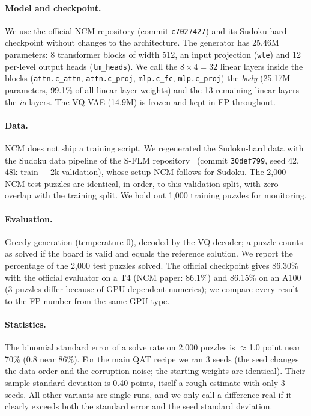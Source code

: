 \documentclass[11pt]{article}
\begin{document}
\paragraph{Model and checkpoint.}
We use the official NCM repository (commit \texttt{c7027427}) and its Sudoku-hard checkpoint without changes to
the architecture. The generator has 25.46M parameters: 8 transformer blocks of width 512, an input projection
(\texttt{wte}) and 12 per-level output heads (\texttt{lm\_heads}). We call the $8\times4=32$ linear layers inside
the blocks (\texttt{attn.c\_attn}, \texttt{attn.c\_proj}, \texttt{mlp.c\_fc}, \texttt{mlp.c\_proj}) the
\emph{body} (25.17M parameters, 99.1\% of all linear-layer weights) and the 13 remaining linear layers the
\emph{io} layers. The VQ-VAE (14.9M) is frozen and kept in FP throughout.

\paragraph{Data.}
NCM does not ship a training script. We regenerated the Sudoku-hard data with the Sudoku data pipeline of the
S-FLM repository~\citep{deschenaux2026sflm} (commit \texttt{30def799}, seed 42, 48k train + 2k validation), whose
setup NCM follows for Sudoku. The 2,000 NCM test puzzles are identical, in order, to this validation split, with
zero overlap with the training split. We hold out 1,000 training puzzles for monitoring.

\paragraph{Evaluation.}
Greedy generation (temperature 0), decoded by the VQ decoder; a puzzle counts as solved if the board is valid and
equals the reference solution. We report the percentage of the 2,000 test puzzles solved. The official checkpoint
gives 86.30\% with the official evaluator on a T4 (NCM paper: 86.1\%) and 86.15\% on an A100 (3 puzzles differ
because of GPU-dependent numerics); we compare every result to the FP number from the same GPU type.

\paragraph{Statistics.}
The binomial standard error of a solve rate on 2,000 puzzles is $\approx$1.0 point near 70\% (0.8 near 86\%).
For the main QAT recipe we ran 3 seeds (the seed changes the data order and the corruption noise; the starting
weights are identical). Their sample standard deviation is 0.40 points, itself a rough estimate with only 3 seeds.
All other variants are single runs, and we only call a difference real if it clearly exceeds both the standard
error and the seed standard deviation.
\end{document}
